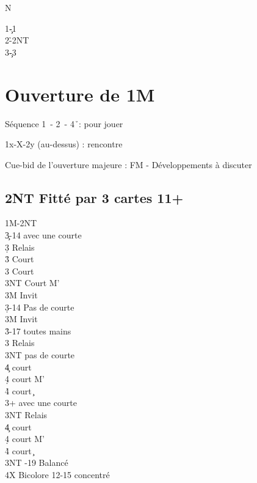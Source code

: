 \documentclass[a4paper]{article}
\begin{document}
\dealdiagramenw
{}
{}
{}
{N}

\begin{bidtable}
1\c-1\s\\
2\h-2NT\\
3\c-3\s
\end{bidtable}

\section{Ouverture de 1M}

Séquence 1\s\ - 2\s\ - 4\h\ : pour jouer

\begin{bidtable}
1x-X-2y \> (au-dessus) : rencontre
\end{bidtable}

Cue-bid de l'ouverture majeure : FM - Développements à discuter

\subsection{2NT Fitté par 3 cartes 11+}

\begin{bidtable}
1M-2NT\\
3\c {}-14 avec une courte\+\\
3\d \> Relais\+\\
3\h \> Court \c \\
3\s \> Court \d \\
3NT \> Court M'\-\\
3M \> Invit\-\\
3\d {}-14 Pas de courte\+\\
3M \> Invit\-\\
3\h {}-17 toutes mains\+\\
3\s \> Relais\+\\
3NT \> pas de courte\\
4\c \> court \d \\
4\d \> court M'\\
4\h \> court \c \-\-\\
3\s {}+ avec une courte\+\\
3NT \> Relais\+\\
4\c \> court \d \\
4\d \> court M'\\
4\h \> court \c \-\-\\
3NT -19 Balancé\\
4X \> Bicolore 12-15 concentré
\end{bidtable}
\end{document}
